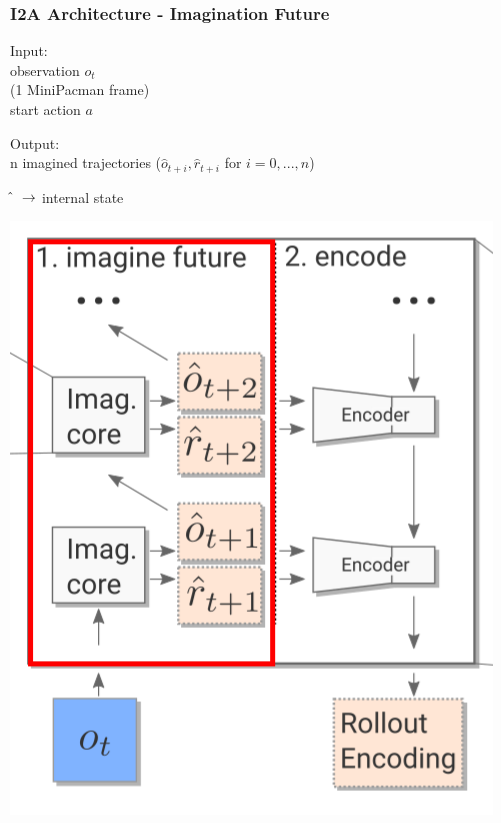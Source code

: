 \begin{frame}
    \frametitle{I2A Architecture - Imagination Future}

\begin{multicols}{2}
	\begin{PraesentationAufzaehlung}
		\item Input:\\
		observation $o_t$ \\
		(1 MiniPacman frame)\\
		start action $a$
		\item Output:\\
		n imagined trajectories ($\hat{o}_{t+i}, \hat{r}_{t+i}$ for $i = 0, ..., n$)
		\item $\hat{} \hspace{2mm} \rightarrow$ internal state
	\end{PraesentationAufzaehlung}
    \vfill\columnbreak
	\begin{center}
    \includegraphics[height=.5\textheight]{./Images/imagine_future.png}%
	\end{center}
\end{multicols}
    
\end{frame}
\clearpage

